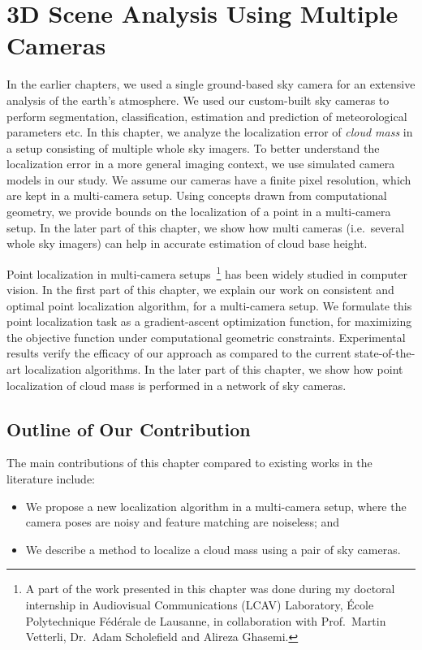 \chapter{3D Scene Analysis Using Multiple Cameras}
\label{chap:localize}

In the earlier chapters, we used a single ground-based sky camera for an extensive analysis of the earth's atmosphere. We used our custom-built sky cameras to perform segmentation, classification, estimation and prediction of meteorological parameters etc. In this chapter, we analyze the localization error of \emph{cloud mass} in a setup consisting of multiple whole sky imagers. To better understand the localization error in a more general imaging context, we use simulated camera models in our study. We assume our cameras have a finite pixel resolution, which are kept in a multi-camera setup. Using concepts drawn from computational geometry, we provide bounds on the localization of a point in a multi-camera setup. In the later part of this chapter, we show how multi cameras (i.e.\ several whole sky imagers) can help in accurate estimation of cloud base height. 

Point localization in multi-camera setups~\footnote{A part of the work presented in this chapter was done during my doctoral internship in Audiovisual Communications (LCAV) Laboratory, \'{E}cole Polytechnique F\'{e}d\'{e}rale de Lausanne, in collaboration with Prof.\ Martin Vetterli, Dr.\ Adam Scholefield and Alireza Ghasemi.} has been widely studied in computer vision. In the first part of this chapter, we explain our work on consistent and optimal point localization algorithm, for a multi-camera setup. 
We formulate this point localization task as a gradient-ascent optimization function, for maximizing the objective function under computational geometric constraints. Experimental results verify the efficacy of our approach as compared to the current state-of-the-art localization algorithms. In the later part of this chapter, we show how point localization of cloud mass is performed in a network of sky cameras. 

\section{Outline of Our Contribution}

The main contributions of this chapter compared to existing works in the literature include:

\begin{itemize}
\item We propose a new localization algorithm in a multi-camera setup, where the camera poses are noisy and feature matching are noiseless; and
\item We describe a method to localize a cloud mass using a pair of sky cameras.
\end{itemize}

